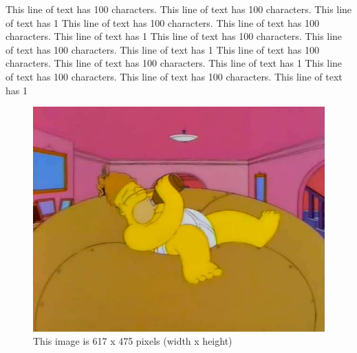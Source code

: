 \documentclass[utf8]{test_class}
\begin{document}
This line of text has 100 characters. This line of text has 100 characters. This line of text has 1 
This line of text has 100 characters. This line of text has 100 characters. This line of text has 1 
This line of text has 100 characters. This line of text has 100 characters. This line of text has 1 
This line of text has 100 characters. This line of text has 100 characters. This line of text has 1 
This line of text has 100 characters. This line of text has 100 characters. This line of text has 1 


\begin{figure}[htbp]
        \begin{center}
        \includegraphics[width=\linewidth]{homer_giant_donut.jpg}
        \end{center}
    \caption{ This image is 617 x 475 pixels (width x height) }\label{fig:homer_giant_donut}
\end{figure}

\end{document}
